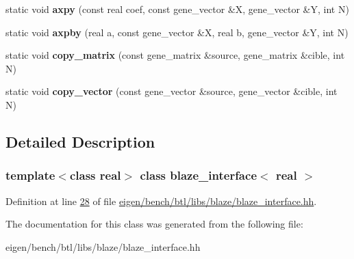 \begin{DoxyCompactItemize}
\item 
\mbox{\label{classblaze__interface_a92bfe236825df0b75f072d994d63cf21}} 
static void {\bfseries axpy} (const real coef, const gene\+\_\+vector \&X, gene\+\_\+vector \&Y, int N)
\item 
\mbox{\label{classblaze__interface_a301efbd4d0269426e49e560ab594ab2b}} 
static void {\bfseries axpby} (real a, const gene\+\_\+vector \&X, real b, gene\+\_\+vector \&Y, int N)
\item 
\mbox{\label{classblaze__interface_a84778950c524019b0fb5e554bcfcacb2}} 
static void {\bfseries copy\+\_\+matrix} (const gene\+\_\+matrix \&source, gene\+\_\+matrix \&cible, int N)
\item 
\mbox{\label{classblaze__interface_ad1af38b455850b4af1e4f421a705c212}} 
static void {\bfseries copy\+\_\+vector} (const gene\+\_\+vector \&source, gene\+\_\+vector \&cible, int N)
\end{DoxyCompactItemize}


\subsection{Detailed Description}
\subsubsection*{template$<$class real$>$\newline
class blaze\+\_\+interface$<$ real $>$}



Definition at line \hyperlink{eigen_2bench_2btl_2libs_2blaze_2blaze__interface_8hh_source_l00028}{28} of file \hyperlink{eigen_2bench_2btl_2libs_2blaze_2blaze__interface_8hh_source}{eigen/bench/btl/libs/blaze/blaze\+\_\+interface.\+hh}.



The documentation for this class was generated from the following file\+:\begin{DoxyCompactItemize}
\item 
eigen/bench/btl/libs/blaze/blaze\+\_\+interface.\+hh\end{DoxyCompactItemize}
